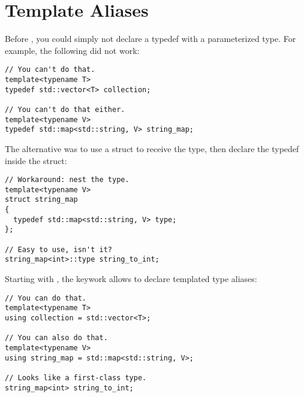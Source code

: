 \section{Template Aliases}

Before , you could simply not declare a typedef with a
parameterized type. For example, the following did not work:

\begin{lstlisting}
// You can't do that.
template<typename T>
typedef std::vector<T> collection;

// You can't do that either.
template<typename V>
typedef std::map<std::string, V> string_map;
\end{lstlisting}

The alternative was to use a struct to receive the type, then declare
the typedef inside the struct:

\begin{lstlisting}
// Workaround: nest the type.
template<typename V>
struct string_map
{
  typedef std::map<std::string, V> type;
};

// Easy to use, isn't it?
string_map<int>::type string_to_int;
\end{lstlisting}

Starting with , the  keywork allows to declare
templated type aliases:

\begin{lstlisting}
// You can do that.
template<typename T>
using collection = std::vector<T>;

// You can also do that.
template<typename V>
using string_map = std::map<std::string, V>;

// Looks like a first-class type.
string_map<int> string_to_int;
\end{lstlisting}
